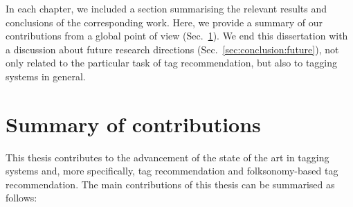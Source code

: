 In each chapter, we included a section summarising the relevant results and conclusions of the corresponding work. 
Here, we provide a summary of our contributions from a global point of view (Sec.~\ref{sec:conclusion:summary}).
We end this dissertation with a discussion about future research directions (Sec.~\ref{sec:conclusion:future}), not only related to the particular task of tag recommendation, but also to tagging systems in general.



\section{Summary of contributions}
\label{sec:conclusion:summary}

This thesis contributes to the advancement of the state of the art in tagging systems and, more specifically, tag recommendation and folksonomy-based tag recommendation. The main contributions of this thesis can be summarised as follows:

